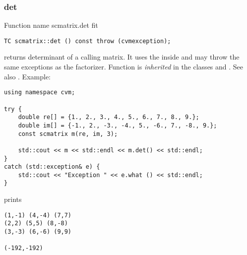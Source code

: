 \subsubsection{det}
Function%
\pdfdest name {scmatrix.det} fit
\begin{verbatim}
TC scmatrix::det () const throw (cvmexception);
\end{verbatim}
returns  determinant of a calling matrix.
It uses the  inside
and may throw the same exceptions as the factorizer.
Function is \emph{inherited} in the classes
and .
See also
.
Example:
\begin{Verbatim}
using namespace cvm;

try {
    double re[] = {1., 2., 3., 4., 5., 6., 7., 8., 9.};
    double im[] = {-1., 2., -3., -4., 5., -6., 7., -8., 9.};
    const scmatrix m(re, im, 3);

    std::cout << m << std::endl << m.det() << std::endl;
}
catch (std::exception& e) {
    std::cout << "Exception " << e.what () << std::endl;
}
\end{Verbatim}
prints
\begin{Verbatim}
(1,-1) (4,-4) (7,7)
(2,2) (5,5) (8,-8)
(3,-3) (6,-6) (9,9)

(-192,-192)
\end{Verbatim}
\newpage



